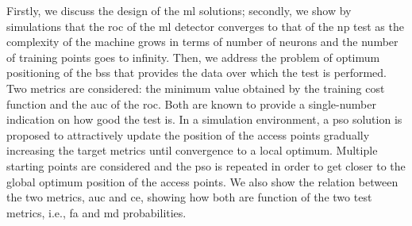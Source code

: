 \documentclass[conference]{IEEEtran}
\begin{document}
Firstly, we discuss the design of the \ac{ml} solutions; secondly, we show by simulations that the \ac{roc} of the \ac{ml} detector converges to that of the \ac{np} test as the complexity of the machine grows in terms of number of neurons and the number of training points goes to infinity. Then, we address the problem of optimum positioning of the \acp{bs} that provides the data over which the test is performed. Two metrics are considered: the minimum value obtained by the training cost function and the \ac{auc} of the \ac{roc}. Both are known to provide a single-number indication on how good the test is. In a simulation environment, a \ac{pso} solution is proposed to attractively update the position of the access points gradually increasing the target metrics until convergence to a local optimum. Multiple starting points are considered and the \ac{pso} is repeated in order to get closer to the global optimum position of the access points. We also show the relation between the two metrics, \ac{auc} and \ac{ce}, showing how both are function of the two test metrics, i.e., \ac{fa} and \ac{md} probabilities.


 
\end{document}
